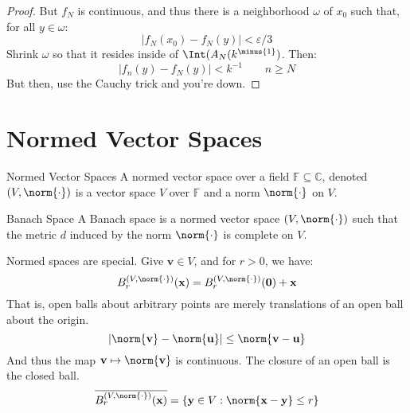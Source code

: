 \documentclass[crop=false,class=article,oneside]{standalone}
\begin{document}
\begin{proof}
            But $f_{N}$ is continuous, and thus there is a
            neighborhood $\omega$ of $x_{0}$ such that, for all
            $y\in\omega$:
            \begin{equation}
                |f_{N}(x_{0})-f_{N}(y)|<\varepsilon/3
            \end{equation}
            Shrink $\omega$ so that it resides inside of
            $\Int(A_{N}(k^{\minus{1}})$. Then:
            \begin{equation}
                |f_{n}(y)-f_{N}(y)|<k^{\minus{1}}
                \quad\quad
                n\geq{N}
            \end{equation}
            But then, use the Cauchy trick and you're down.
        \end{proof}
    \section{Normed Vector Spaces}
        \begin{ldefinition}{Normed Vector Spaces}
            A normed vector space over a field
            $\mathbb{F}\subseteq\mathbb{C}$, denoted
            $(V,\norm{\cdot})$ is a vector space $V$ over
            $\mathbb{F}$ and a norm $\norm{\cdot}$ on $V$.
        \end{ldefinition}
        \begin{ldefinition}{Banach Space}
            A Banach space is a normed vector space
            $(V,\norm{\cdot})$ such that the metric $d$ induced by
            the norm $\norm{\cdot}$ is complete on $V$.
        \end{ldefinition}
        Normed spaces are special. Give $\mathbf{v}\in{V}$, and
        for $r>0$, we have:
        \begin{equation}
            B_{r}^{(V,\norm{\cdot})}(\mathbf{x})=
            B_{r}^{(V,\norm{\cdot})}(\mathbf{0})+\mathbf{x}
        \end{equation}
        That is, open balls about arbitrary points are merely
        translations of an open ball about the origin.
        \begin{equation}
            |\norm{\mathbf{v}}-\norm{\mathbf{u}}|
            \leq\norm{\mathbf{v}-\mathbf{u}}
        \end{equation}
        And thus the map $\mathbf{v}\mapsto\norm{\mathbf{v}}$ is
        continuous. The closure of an open ball is the closed ball.
        \begin{equation}
            \overline{B_{r}^{(V,\norm{\cdot})}(\mathbf{x})}
            =\{\mathbf{y}\in{V}:
                \norm{\mathbf{x}-\mathbf{y}}\leq{r}\}
        \end{equation}
\end{document}

